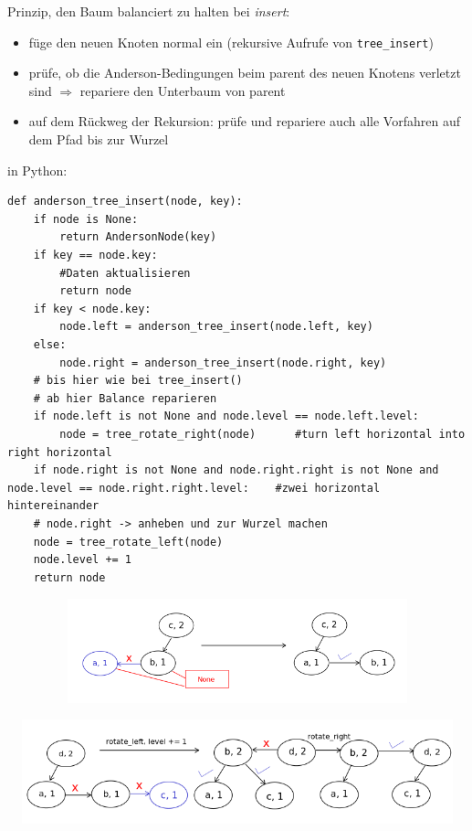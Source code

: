 \documentclass[11pt, fleqn]{scrreprt}
\begin{document}
Prinzip, den Baum balanciert zu halten bei \emph{insert}:
\begin{itemize}
    \item füge den neuen Knoten normal ein (rekursive Aufrufe von \verb|tree_insert|)
    \item prüfe, ob die Anderson-Bedingungen beim parent des neuen Knotens verletzt sind $\Rightarrow$ repariere den Unterbaum von parent
    \item auf dem Rückweg der Rekursion: prüfe und repariere auch alle Vorfahren auf dem Pfad bis zur Wurzel
\end{itemize}
in Python:
\begin{verbatim}
def anderson_tree_insert(node, key):
    if node is None:
        return AndersonNode(key)
    if key == node.key:
        #Daten aktualisieren
        return node
    if key < node.key:
        node.left = anderson_tree_insert(node.left, key)
    else:
        node.right = anderson_tree_insert(node.right, key)
    # bis hier wie bei tree_insert()
    # ab hier Balance reparieren
    if node.left is not None and node.level == node.left.level:
        node = tree_rotate_right(node)      #turn left horizontal into right horizontal
    if node.right is not None and node.right.right is not None and node.level == node.right.right.level:    #zwei horizontal hintereinander
    # node.right -> anheben und zur Wurzel machen
    node = tree_rotate_left(node)
    node.level += 1
    return node
\end{verbatim}
\includegraphics[width=16cm,height=3cm,keepaspectratio]{./Pictures/AndersonPython1.png}

\includegraphics[width=16cm,height=3cm,keepaspectratio]{./Pictures/AndersonPython2.png}
\end{document}

